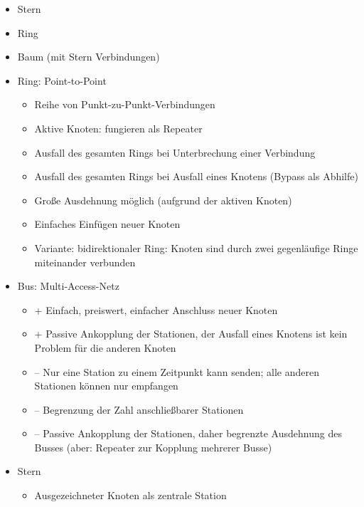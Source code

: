 \begin{itemize}
    \item Stern
    \item Ring
    \item Baum (mit Stern Verbindungen)
\end{itemize}

\begin{itemize}
    \item Ring: Point-to-Point
    \begin{itemize}
        \item Reihe von Punkt-zu-Punkt-Verbindungen
        \item Aktive Knoten: fungieren als Repeater
        \item Ausfall des gesamten Rings bei Unterbrechung einer Verbindung
        \item Ausfall des gesamten Rings bei Ausfall eines Knotens (Bypass als Abhilfe)
        \item Große Ausdehnung möglich (aufgrund der aktiven Knoten)
        \item Einfaches Einfügen neuer Knoten
        \item Variante: bidirektionaler Ring: Knoten sind durch zwei gegenläufige Ringe miteinander verbunden
    \end{itemize}
    \item Bus: Multi-Access-Netz
    \begin{itemize}
        \item + Einfach, preiswert, einfacher Anschluss neuer Knoten
        \item + Passive Ankopplung der Stationen, der Ausfall eines Knotens ist kein Problem für die anderen Knoten
        \item – Nur eine Station zu einem Zeitpunkt kann senden;
        alle anderen Stationen können nur empfangen
        \item – Begrenzung der Zahl anschließbarer Stationen
        \item – Passive Ankopplung der Stationen, daher begrenzte Ausdehnung des Busses (aber: Repeater zur Kopplung mehrerer Busse)
    \end{itemize}
    \item Stern
    \begin{itemize}
        \item Ausgezeichneter Knoten als zentrale Station

\end{itemize}
\end{itemize}
